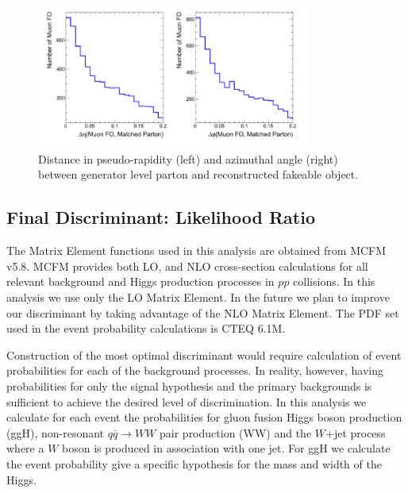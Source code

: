 \documentclass{cmspaper}
\begin{document}
\begin{figure}[!htbp]                                                                                         
\begin{center}                                                                                                
\includegraphics[width=0.8\textwidth]{figures/PartonLeptonDIrection.png}                                            
\caption{Distance in pseudo-rapidity (left) and azimuthal angle (right)
between generator level parton and reconstructed fakeable object.}                                                                                 
\label{fig:partonleptondirection}                                                                                          
\end{center}                                                                                                  
\end{figure}   


\clearpage
\subsection{Final Discriminant: Likelihood Ratio}
\label{sec:LR}
The Matrix Element functions used in this analysis are obtained from MCFM v5.8.  
MCFM provides both LO, and NLO cross-section calculations for 
all relevant background and Higgs production processes in $pp$ collisions. In this analysis 
we use only the LO Matrix Element. In the future we plan to improve our discriminant 
by taking advantage of the NLO Matrix Element. The PDF set used in the event probability 
calculations is CTEQ 6.1M.

Construction of the most optimal discriminant would require calculation 
of event probabilities for each of the background processes. In reality, however, having 
probabilities for only the signal hypothesis and the primary backgrounds is sufficient to achieve 
the desired level of discrimination. In this analysis we calculate for each event the probabilities 
for gluon fusion Higgs boson production (ggH), non-resonant $q\bar{q}\rightarrow WW$ pair 
production (WW) and the $W$+jet process where a $W$ boson is produced in association
with one jet.   For ggH we calculate the event probability give a specific hypothesis for the
mass and width of the Higgs.
\end{document}
